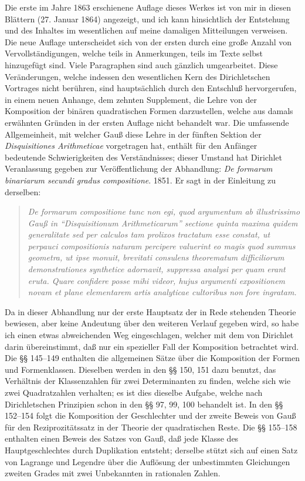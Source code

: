 \documentclass[11pt]{article}
\newcommand{\origpage}[1]{\par\vspace{0.25em}\noindent{\footnotesize\itshape [Gedruckte Seite #1]}\par\vspace{0.25em}}
\begin{document}
Die erste im Jahre 1863 erschienene Auflage dieses Werkes ist von mir in diesen Blättern (27. Januar 1864) angezeigt, und ich kann hinsichtlich der Entstehung und des Inhaltes im wesentlichen auf meine damaligen Mitteilungen verweisen. Die neue Auflage unterscheidet sich von der ersten durch eine große Anzahl von Vervollständigungen, welche teils in Anmerkungen, teils im Texte selbst hinzugefügt sind. Viele Paragraphen sind auch gänzlich umgearbeitet. Diese Veränderungen, welche indessen den wesentlichen Kern des Dirichletschen Vortrages nicht berühren, sind hauptsächlich durch den Entschluß hervorgerufen, in einem neuen Anhange, dem zehnten Supplement, die Lehre von der Komposition der binären quadratischen Formen darzustellen, welche aus damals erwähnten Gründen in der ersten Auflage nicht behandelt war. Die umfassende Allgemeinheit, mit welcher Gauß diese Lehre in der fünften Sektion der \textit{Disquisitiones Arithmeticae} vorgetragen hat, enthält für den Anfänger bedeutende Schwierigkeiten des Verständnisses; dieser Umstand hat Dirichlet Veranlassung gegeben zur Veröffentlichung der Abhandlung: \textit{De formarum binariarum secundi gradus compositione}. 1851. Er sagt in der Einleitung zu derselben:

\begin{quote}\itshape
De formarum compositione tunc non egi, quod argumentum ab illustrissimo Gauß in ``Disquisitionum Arithmeticarum'' sectione quinta maxima quidem generalitate sed per calculos tam prolixos tractatum esse constat, ut perpauci compositionis naturam percipere valuerint eo magis quod summus geometra, ut ipse monuit, brevitati consulens theorematum difficiliorum demonstrationes synthetice adornavit, suppressa analysi per quam erant eruta. Quare confidere posse mihi videor, hujus argumenti expositionem novam et plane elementarem artis analyticae cultoribus non fore ingratam.
\end{quote}

\origpage{400}
Da in dieser Abhandlung nur der erste Hauptsatz der in Rede stehenden Theorie bewiesen, aber keine Andeutung über den weiteren Verlauf gegeben wird, so habe ich einen etwas abweichenden Weg eingeschlagen, welcher mit dem von Dirichlet darin übereinstimmt, daß nur ein spezieller Fall der Komposition betrachtet wird. Die §§ 145--149 enthalten die allgemeinen Sätze über die Komposition der Formen und Formenklassen. Dieselben werden in den §§ 150, 151 dazu benutzt, das Verhältnis der Klassenzahlen für zwei Determinanten zu finden, welche sich wie zwei Quadratzahlen verhalten; es ist dies dieselbe Aufgabe, welche nach Dirichletschen Prinzipien schon in den §§ 97, 99, 100 behandelt ist. In den §§ 152--154 folgt die Komposition der Geschlechter und der zweite Beweis von Gauß für den Reziprozitätssatz in der Theorie der quadratischen Reste. Die §§ 155--158 enthalten einen Beweis des Satzes von Gauß, daß jede Klasse des Hauptgeschlechtes durch Duplikation entsteht; derselbe stützt sich auf einen Satz von Lagrange und Legendre über die Auflösung der unbestimmten Gleichungen zweiten Grades mit zwei Unbekannten in rationalen Zahlen.
\end{document}
